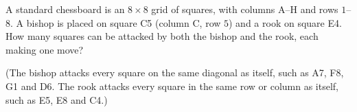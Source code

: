 A standard chessboard is an $8\times8$ grid of squares, with columns A--H and rows $1$--$8$. A bishop is placed on square C5 (column C, row $5$) and a rook on square E4. How many squares can be attacked by both the bishop and the rook, each making one move?

(The bishop attacks every square on the same diagonal as itself, such as A7, F8, G1 and D6. The rook attacks every square in the same row or column as itself, such as E5, E8 and C4.)
